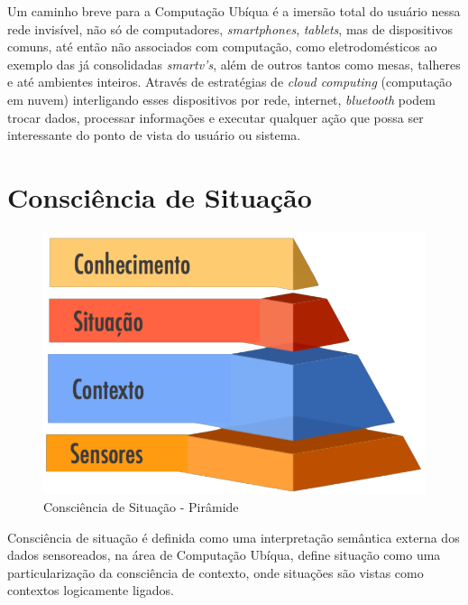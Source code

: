 \documentclass[12pt,a4paper,compsoc]{IEEEtran}
\begin{document}
  Um caminho breve para a Computação Ubíqua é a imersão total do usuário nessa rede invisível, não
  só de computadores, \textit{smartphones}, \textit{tablets}, mas de dispositivos comuns, até então
  não associados com computação, como eletrodomésticos ao exemplo das já consolidadas 
  \textit{smartv's}, além de outros tantos como mesas, talheres e até ambientes inteiros. Através
  de estratégias de \textit{cloud computing} (computação em nuvem) interligando esses dispositivos
  por rede, internet, \textit{bluetooth} podem trocar dados, processar informações e executar
  qualquer ação que possa ser interessante do ponto de vista do usuário ou sistema.
  

\section{Consciência de Situação}

  \begin{figure}[ht]
  \centerline{\includegraphics[scale=.20]{imagens/consciencia-de-situacao-piramide.png}}
  \caption{Consciência de Situação - Pirâmide \cite{almeida2013}}
  \label{cs-piramide}
  \end{figure}

  Consciência de situação é definida como uma interpretação semântica externa dos dados 
  sensoreados, na área de Computação Ubíqua, \cite{anagnostopoulos2006} define situação como uma 
  particularização da consciência de contexto, onde situações são vistas como contextos logicamente
  ligados.
  
\end{document}
